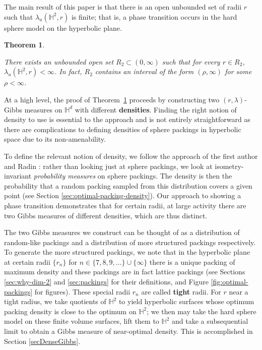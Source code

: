 \documentclass[11pt]{amsart}
\newtheorem{theorem}{Theorem}
\theoremstyle{definition}
\theoremstyle{remark}
\renewcommand{\H}{\mathbb{H}}
\newcommand{\lam}{\lambda}
\begin{document}
The main result of this paper is that  there is an open unbounded set of radii $r$ such that $\lambda_u(\H^2, r)$ is finite; that is, a phase transition occurs in the hard sphere model on the hyperbolic plane. 




\begin{theorem}\label{T:main}


There exists an unbounded open set $R_2 \subset (0,\infty)$ such that for every $r \in R_2$, $\lambda_{u}(\H^2,r) < \infty$. In fact, $R_2$ contains an interval of the form $(\rho,\infty)$ for some $\rho<\infty$.
\end{theorem}



At a  high level, the proof of Theorem~\ref{T:main} proceeds by constructing two  $(r,\lam)$-Gibbs measures on $\H^d$ with different {\bf densities}.  Finding the right notion of density to use is essential to the approach and  is not entirely straightforward as there are complications to defining densities of sphere packings in hyperbolic space due to its non-amenability. 

To define the relevant notion of density, we follow the approach of the first author and Radin \cite{bowen2002densest}: rather than looking just at sphere packings, we look at isometry-invariant \emph{probability measures} on sphere packings.  The density is then the probability that a random packing sampled from this distribution covers a given point (see Section \ref{sec:optimal-packing-density}).  Our approach to showing a phase transition demonstrates that for certain radii, at large activity there are two Gibbs measures of different densities, which are thus distinct. 

The two Gibbs measures we construct can be thought of as a distribution of random-like packings and a distribution of  more structured packings respectively.  To generate the more structured packings, we note that in the hyperbolic plane at certain radii $\{r_n\}$ for $n \in \{7,8,9,\ldots\} \cup \{\infty\}$ there is a unique packing of maximum density and these packings are in fact lattice packings (see Sections \ref{sec:why-dim-2} and \ref{sec:packings} for their definitions, and Figure \ref{fig:optimal-packings} for figures).  These special radii $r_n$ are called \textbf{tight} radii.  For $r$ near a tight radius, we take quotients of $\H^2$ to yield hyperbolic surfaces whose optimum packing density is close to the optimum on $\H^2$; we then may take the hard sphere model on these finite volume surfaces, lift them to $\H^2$ and take a subsequential limit to obtain a Gibbs measure of near-optimal density.  This is accomplished in Section \ref{secDenseGibbs}.
\end{document}
